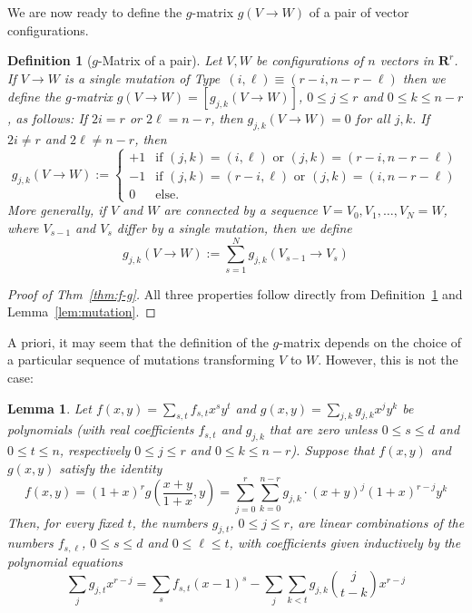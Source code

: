 \documentclass[11pt]{article}
\newtheorem{lemma}[theorem]{Lemma}
\newtheorem{definition}[theorem]{Definition}
\renewcommand{\leq}{\leqslant}
\newcommand{\R}{\mathbf{R}}
\begin{document}
%
We are now ready to define the $g$-matrix $g(V\rightarrow W)$ of a pair of vector configurations.  
\begin{definition}[$g$-Matrix of a pair]
\label{def:g-pair}
Let $V,W$ be configurations of $n$ vectors in $\R^r$. 
%
If $V\to W$ is a single mutation of Type~$(i,\ell)\equiv(r-i,n-r-\ell)$ then we define the $g$-matrix 
$g(V\rightarrow W)=[g_{j,k}(V\rightarrow W)]$, $0\leq j\leq r$ and $0\leq k \leq n-r$, as follows: 
%
If $2i=r$ or $2\ell=n-r$, then $g_{j,k}(V\to W)=0$ for all $j,k$. If $2i\neq r$ and $2\ell\neq n-r$, then
\[
g_{j,k}(V\to W):= 
\begin{cases}
  +1 & \textrm{if } (j,k)=(i,\ell) \textrm{ or }(j,k)=(r-i,n-r-\ell)\\
  -1 & \textrm{if } (j,k)=(r-i,\ell) \textrm{ or }(j,k)=(i,n-r-\ell)\\
  0 & \textrm{else.}  
\end{cases}
\]
%
%
More generally, if $V$ and $W$ are connected by a sequence $V=V_0, V_1,\dots, V_N=W$, where $V_{s-1}$ and $V_s$ differ by a single mutation, then we define
\[
g_{j,k}(V\to W):= \sum_{s=1}^N g_{j,k}(V_{s-1}\to V_s)
\]
\end{definition}
%
\begin{proof}[Proof of Thm~\ref{thm:f-g}]
All three properties follow directly from Definition~\ref{def:g-pair} and Lemma~\ref{lem:mutation}.
\end{proof}
%
A priori, it may seem that the definition of the $g$-matrix depends on the choice of a particular sequence of mutations transforming $V$ to $W$. However, this is not the case: 
%
\begin{lemma} 
\label{lem:g-f}
Let $f(x,y)=\sum_{s,t}f_{s,t}x^sy^t$ and $g(x,y)=\sum_{j,k} g_{j,k} x^j y^k$ be polynomials (with real coefficients $f_{s,t}$ and $g_{j,k}$ that are zero unless $0\leq s\leq d$ and $0\leq t\leq n$, respectively $0\leq j\leq r$ and $0\leq k\leq n-r$). Suppose that $f(x,y)$ and $g(x,y)$ satisfy the identity
\begin{equation}
\label{eq:f-g-to-be-inverted} 
f(x,y)= (1+x)^r g (\textstyle \frac{x+y}{1+x},y)=\sum_{j=0}^r \sum_{k=0}^{n-r} g_{j,k}\cdot (x+y)^j (1+x)^{r-j} y^k
\end{equation}
Then, for every fixed $t$, the numbers $g_{j,t}$, $0\leq j\leq r$, are linear combinations of the numbers $f_{s,\ell}$, $0\leq s\leq d$ and $0\leq \ell \leq t$, with coefficients given inductively by the polynomial equations 
\[
\sum_j g_{j,t} x^{r-j} = \sum_s f_{s,t} (x-1)^s - \sum_j \sum_{k<t} g_{j,k}\binom{j}{t-k}x^{r-j}
\]
\end{lemma}
\end{document}

